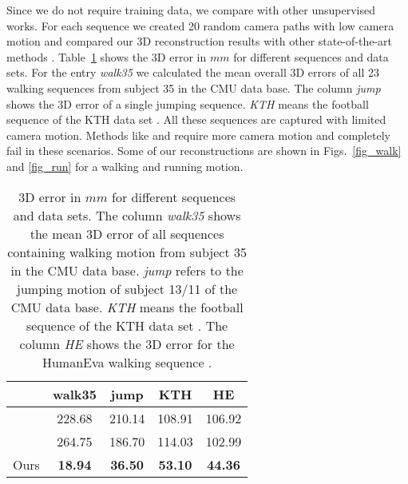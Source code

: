 \documentclass[10pt,letterpaper]{article}
\begin{document}
Since we do not require training data, we compare with other unsupervised works. For each sequence we created 20 random camera paths with low camera motion and compared our 3D reconstruction results with other state-of-the-art methods \cite{akhter2011trajectory,gotardo12}. Table~\ref{tab_eval_results} shows the 3D error in $mm$ for different sequences and data sets. For the entry \textit{walk35} we calculated the mean overall 3D errors of all 23 walking sequences from subject 35 in the CMU data base. The column \textit{jump} shows the 3D error of a single jumping sequence. \textit{KTH} means the football sequence of the KTH data set \cite{kazemi2013multi}. All these sequences are captured with limited camera motion. %
Methods like \cite{akhter2011trajectory} and \cite{gotardo12} require more camera motion and completely fail in these scenarios. Some of our reconstructions are shown in Figs.~\ref{fig_walk} and \ref{fig_run} for a walking and running motion.

\begin{table}
	\centering
\caption{3D error in $mm$ for different sequences and data sets. The column \textit{walk35} shows the mean 3D error of all sequences containing walking motion from subject 35 in the CMU data base. \textit{jump} refers to the jumping motion of subject 13/11 of the CMU data base. \textit{KTH} means the football sequence of the KTH data set \cite{kazemi2013multi}. The column \textit{HE} shows the 3D error for the HumanEva walking sequence \cite{humaneva}.}
\label{tab_eval_results}
\begin{tabular}{| l | c | c | c | c |}
\hline
 & walk35 & jump & KTH & HE \\ \hline\hline
\cite{akhter2011trajectory} & 228.68 & 210.14 & 108.91 & 106.92 \\
\cite{gotardo12} & 264.75 & 186.70 & 114.03 & 102.99 \\
Ours & \textbf{18.94} & \textbf{36.50} & \textbf{53.10} & \textbf{44.36} \\
\hline
\end{tabular}
\end{table}
\end{document}
